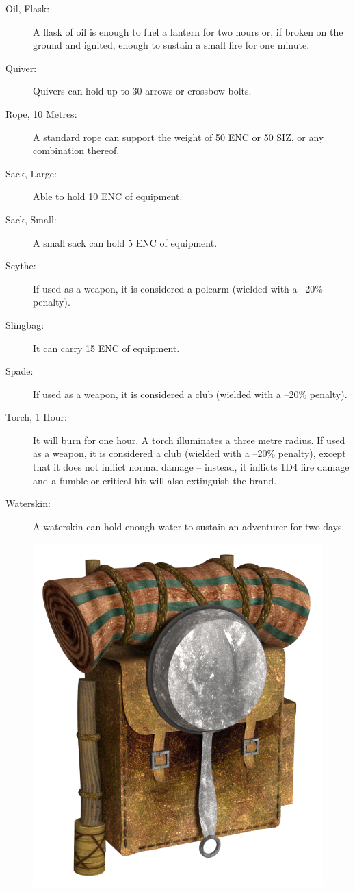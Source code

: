 \begin{description}
	\item[Oil, Flask:] A flask of oil is enough to fuel a lantern for two hours or, if broken on the ground and ignited, enough to sustain a small fire for one minute. 
	\item[Quiver:] Quivers can hold up to 30 arrows or crossbow bolts. 
	\item[Rope, 10 Metres:] A standard rope can support the weight of 50 ENC or 50 SIZ, or any combination thereof. 
	\item[Sack, Large:] Able to hold 10 ENC of equipment. 
	\item[Sack, Small:] A small sack can hold 5 ENC of equipment. 
	\item[Scythe:] If used as a weapon, it is considered a polearm (wielded with a –20\% penalty). 
	\item[Slingbag:] It can carry 15 ENC of equipment. 
	\item[Spade:] If used as a weapon, it is considered a club (wielded with a –20\% penalty). 
	\item[Torch, 1 Hour:] It will burn for one hour. A torch illuminates a three metre radius. If used as a weapon, it is considered a club (wielded with a –20\% penalty), except that it does not inflict normal damage – instead, it inflicts 1D4 fire damage and a fumble or critical hit will also extinguish the brand. 
	\item[Waterskin:] A waterskin can hold enough water to sustain an adventurer for two days.
\end{description}

\begin{figure}[h]
\begin{center}
\includegraphics[scale=0.25]{img/Backpack.png}
\end{center}
\end{figure}


